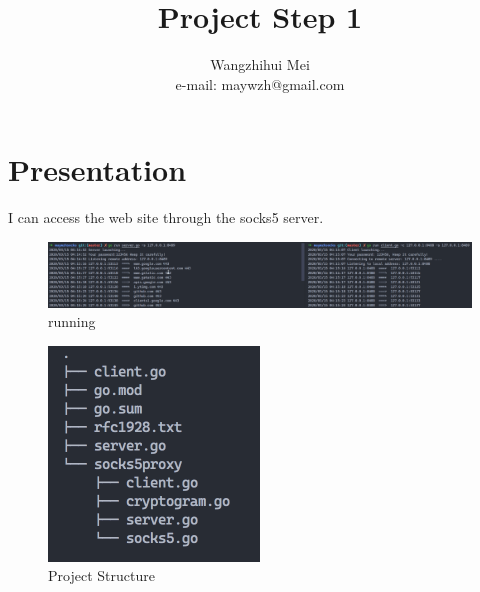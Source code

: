 \documentclass[a4paper,10pt]{article}
\begin{document}
%
   \title{Project Step 1}

   \author{Wangzhihui Mei \\ e-mail: maywzh@gmail.com}
          
   \date{}

   \maketitle
   
  \newpage
    
\section*{Presentation}
  I can access the web site through the socks5 server.

  \begin{figure}[h]
    \centering
    \includegraphics[width=1.0\textwidth]{image/img1.png}
    \caption{running}
  \end{figure}

  \begin{figure}[h]
    \centering
    \includegraphics[width=0.5\textwidth]{image/tree.png}
    \caption{Project Structure}
  \end{figure}
\end{document}
